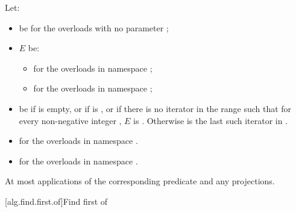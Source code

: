 \begin{itemdescr}
\pnum
Let:
\begin{itemize}
\item
   be 
  for the overloads with no parameter ;
\item
  $E$ be:
  \begin{itemize}
  \item
    for the overloads in namespace ;
  \item
    for the overloads in namespace ;
  \end{itemize}
\item
   be  if  is empty,
  or if  is ,
  or if there is no iterator
  in the range 
  such that for every non-negative integer
  , $E$ is .
  Otherwise  is the last such iterator
  in .
\end{itemize}

\pnum
\returns
\begin{itemize}
\item {} for the overloads in namespace .
\item {}
  for the overloads in namespace .
\end{itemize}

\pnum
\complexity
At most
applications of the corresponding predicate and any projections.
\end{itemdescr}

[alg.find.first.of]{Find first of}

